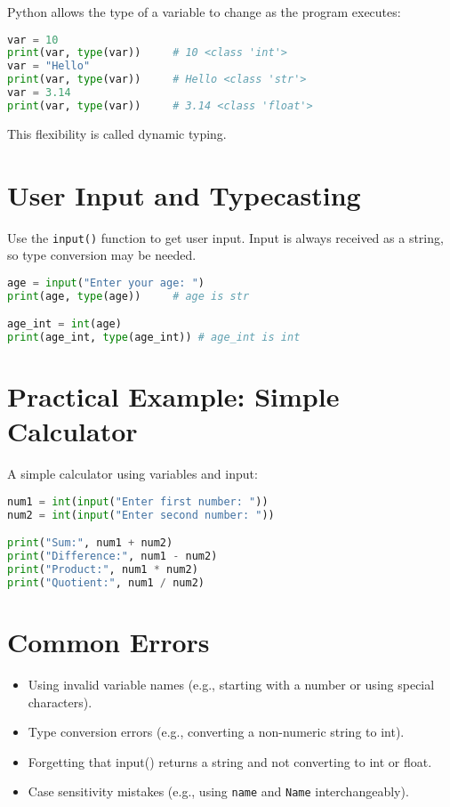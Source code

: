 Python allows the type of a variable to change as the program executes:

\begin{lstlisting}[language=Python]
var = 10
print(var, type(var))     # 10 <class 'int'>
var = "Hello"
print(var, type(var))     # Hello <class 'str'>
var = 3.14
print(var, type(var))     # 3.14 <class 'float'>
\end{lstlisting}

This flexibility is called dynamic typing.

\section{User Input and Typecasting}

Use the \texttt{input()} function to get user input.  
Input is always received as a string, so type conversion may be needed.

\begin{lstlisting}[language=Python]
age = input("Enter your age: ")
print(age, type(age))     # age is str

age_int = int(age)
print(age_int, type(age_int)) # age_int is int
\end{lstlisting}

\section{Practical Example: Simple Calculator}

A simple calculator using variables and input:

\begin{lstlisting}[language=Python]
num1 = int(input("Enter first number: "))
num2 = int(input("Enter second number: "))

print("Sum:", num1 + num2)
print("Difference:", num1 - num2)
print("Product:", num1 * num2)
print("Quotient:", num1 / num2)
\end{lstlisting}

\section{Common Errors}

\begin{itemize}
    \item Using invalid variable names (e.g., starting with a number or using special characters).
    \item Type conversion errors (e.g., converting a non-numeric string to int).
    \item Forgetting that input() returns a string and not converting to int or float.
    \item Case sensitivity mistakes (e.g., using \texttt{name} and \texttt{Name} interchangeably).
\end{itemize}

